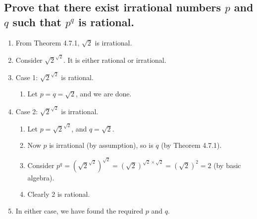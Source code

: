 \documentclass{article}
\begin{document}
\subsection*{Prove that there exist irrational numbers $p$ and $q$ such that $p^q$ is rational.}
\begin{enumerate}
    \item From Theorem 4.7.1, $\sqrt{2}$ is irrational. 
    \item Consider $\sqrt{2}^{\sqrt{2}}$. It is either rational or irrational. 
    \item Case 1: $\sqrt{2}^{\sqrt{2}}$ is rational.
    \begin{enumerate}
        \item Let $p=q=\sqrt{2}$, and we are done. 
    \end{enumerate}
    \item Case 2: $\sqrt{2}^{\sqrt{2}}$ is irrational.
    \begin{enumerate}
        \item Let $p=\sqrt{2}^{\sqrt{2}}$, and $q={\sqrt{2}}$.
        \item Now $p$ is irrational (by assumption), so is $q$ (by Theorem 4.7.1).
        \item Consider $p^q=(\sqrt{2}^{\sqrt{2}})^{\sqrt{2}}=(\sqrt{2})^{\sqrt{2}\times\sqrt{2}}=(\sqrt{2})^2=2$ (by basic algebra).
        \item Clearly 2 is rational. 
    \end{enumerate}
    \item In either case, we have found the required $p$ and $q$. 
\end{enumerate}

\vspace{0.1cm}

\endgroup
\end{document}
